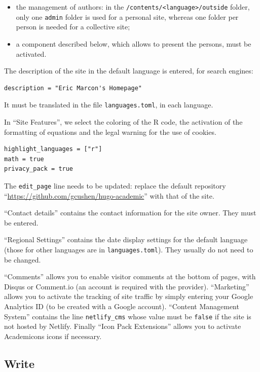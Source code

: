 \documentclass[
  12pt,
  american,
  a4paper,
  extrafontsizes,onecolumn,openright
  ]{memoir}
\providecommand{\tightlist}{%
  \setlength{\itemsep}{0pt}\setlength{\parskip}{0pt}}
\begin{document}
\begin{itemize}
\tightlist
\item
  the management of authors: in the \texttt{/contents/\textless{}language\textgreater{}/outside} folder, only one \texttt{admin} folder is used for a personal site, whereas one folder per person is needed for a collective site;
\item
  a component described below, which allows to present the persons, must be activated.
\end{itemize}

The description of the site in the default language is entered, for search engines:

\begin{verbatim}
description = "Eric Marcon's Homepage"
\end{verbatim}

It must be translated in the file \texttt{languages.toml}, in each language.

In \enquote{Site Features}, we select the coloring of the R code, the activation of the formatting of equations and the legal warning for the use of cookies.

\begin{verbatim}
highlight_languages = ["r"] 
math = true
privacy_pack = true
\end{verbatim}

The \texttt{edit\_page} line needs to be updated: replace the default repository \enquote{\url{https://github.com/gcushen/hugo-academic}} with that of the site.

\enquote{Contact details} contains the contact information for the site owner.
They must be entered.

\enquote{Regional Settings} contains the date display settings for the default language (those for other languages are in \texttt{languages.toml}).
They usually do not need to be changed.

\enquote{Comments} allows you to enable visitor comments at the bottom of pages, with Disqus or Comment.io (an account is required with the provider).
\enquote{Marketing} allows you to activate the tracking of site traffic by simply entering your Google Analytics ID (to be created with a Google account).
\enquote{Content Management System} contains the line \texttt{netlify\_cms} whose value must be \texttt{false} if the site is not hosted by Netlify.
Finally \enquote{Icon Pack Extensions} allows you to activate Academicons icons if necessary.

\hypertarget{write-2}{%
\subsection{Write}\label{write-2}}
\end{document}
